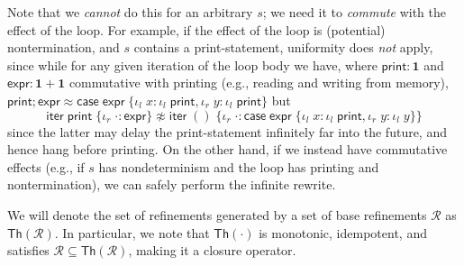 \documentclass[acmsmall,screen,anonymous,review]{acmart}
\newcommand{\mc}[1]{\ensuremath{\mathcal{#1}}}
\newcommand{\mb}[1]{\ensuremath{\mathbf{#1}}}
\newcommand{\ms}[1]{\ensuremath{\mathsf{#1}}}
\newcommand{\lto}{:}
\newcommand{\linl}[1]{\iota_l\;{#1}}
\newcommand{\linr}[1]{\iota_r\;{#1}}
\newcommand{\caseexpr}[5]{\ms{case}\;#1\;\{\linl{#2} \lto #3, \linr{#4} \lto #5\}}
\newcommand{\liter}[3]{\ms{iter}\;#1\;\{ \linr{#2} \lto #3 \}}
\begin{document}
Note that we \emph{cannot} do this for an arbitrary $s$; we need it to \emph{commute} with the
effect of the loop. For example, if the effect of the loop is (potential) nontermination, and $s$
contains a print-statement, uniformity does \emph{not} apply, since while for any given iteration of
the loop body we have, where $\ms{print}: \mb{1}$ and $\ms{expr}: \mb{1} + \mb{1}$ commutative with
printing (e.g., reading and writing from memory),
$
\ms{print} ; \ms{expr} \approx
\caseexpr{\ms{expr}}
  {x}{{\linl{\ms{print}}}}
  {y}{{\linl{\ms{print}}}}
$
but
$$
\liter{\ms{print}}{\cdot}{\ms{expr}} \not\approx
\liter{()}{\cdot}{\caseexpr{\ms{expr}}
  {x}{\linl{\ms{print}}}{y}{\linl{y}}}
$$
since the latter may delay the print-statement infinitely far into the future, and hence hang before
printing. On the other hand, if we instead have commutative effects (e.g., if $s$ has nondeterminism
and the loop has printing and nontermination), we can safely perform the infinite rewrite.

We will denote the set of refinements generated by a set of base refinements $\mc{R}$ as
$\ms{Th}(\mc{R})$. In particular, we note that $\ms{Th}(\cdot)$ is monotonic, idempotent, and
satisfies $\mc{R} \subseteq \ms{Th}(\mc{R})$, making it a closure operator.
\end{document}
